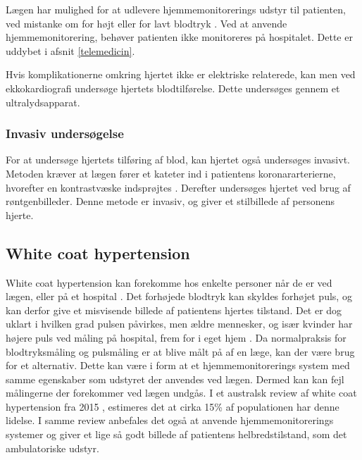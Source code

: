 Lægen har mulighed for at udlevere hjemmemonitorerings udstyr til patienten, ved mistanke om for højt eller for lavt blodtryk \cite{hjerud}. Ved at anvende hjemmemonitorering, behøver patienten ikke monitoreres på hospitalet. Dette er uddybet i afsnit \ref{telemedicin}.

Hvis komplikationerne omkring hjertet ikke er elektriske relaterede, kan men ved ekkokardiografi undersøge hjertets blodtilførelse. Dette undersøges gennem et ultralydsapparat.



\subsubsection{Invasiv undersøgelse}
For at undersøge hjertets tilføring af blod, kan hjertet også undersøges invasivt.
Metoden kræver at lægen fører et kateter ind i patientens koronararterierne, hvorefter en kontrastvæske indsprøjtes \cite{hjerud}. Derefter undersøges hjertet ved brug af røntgenbilleder. Denne metode er invasiv, og giver et stilbillede af personens hjerte. 


\subsection{White coat hypertension}
White coat hypertension kan forekomme hos enkelte personer når de er ved lægen, eller på et hospital \cite{wch}. Det forhøjede blodtryk kan skyldes forhøjet puls, og kan derfor give et misvisende billede af patientens hjertes tilstand. Det er dog uklart i hvilken grad pulsen påvirkes, men ældre mennesker, og især kvinder har højere puls ved måling på hospital, frem for i eget hjem  \cite{bpm}. Da normalpraksis for blodtryksmåling og pulsmåling er at blive målt på af en læge, kan der være brug for et alternativ. Dette kan være i form at et hjemmemonitorerings system med samme egenskaber som udstyret der anvendes ved lægen. Dermed kan kan fejl målingerne der forekommer ved lægen undgås. I et australsk review af white coat hypertension fra 2015 \cite{wch}, estimeres det at cirka 15\% af populationen har denne lidelse. I samme review anbefales det også at anvende hjemmemonitorerings systemer og giver et lige så godt billede af patientens helbredstilstand, som det ambulatoriske udstyr. 




